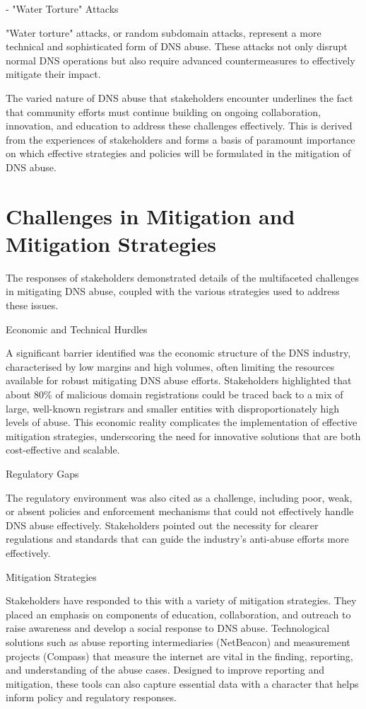 - "Water Torture" Attacks

"Water torture" attacks, or random subdomain attacks, represent a more technical and sophisticated form of DNS abuse. These attacks not only disrupt normal DNS operations but also require advanced countermeasures to effectively mitigate their impact.

The varied nature of DNS abuse that stakeholders encounter underlines the fact that community efforts must continue building on ongoing collaboration, innovation, and education to address these challenges effectively. This is derived from the experiences of stakeholders and forms a basis of paramount importance on which effective strategies and policies will be formulated in the mitigation of DNS abuse.

\section{Challenges in Mitigation and Mitigation Strategies} 

The responses of stakeholders demonstrated details of the multifaceted challenges in mitigating DNS abuse, coupled with the various strategies used to address these issues.

Economic and Technical Hurdles

A significant barrier identified was the economic structure of the DNS industry, characterised by low margins and high volumes, often limiting the resources available for robust mitigating DNS abuse efforts. Stakeholders highlighted that about 80\% of malicious domain registrations could be traced back to a mix of large, well-known registrars and smaller entities with disproportionately high levels of abuse. This economic reality complicates the implementation of effective mitigation strategies, underscoring the need for innovative solutions that are both cost-effective and scalable.

Regulatory Gaps

The regulatory environment was also cited as a challenge, including poor, weak, or absent policies and enforcement mechanisms that could not effectively handle DNS abuse effectively. Stakeholders pointed out the necessity for clearer regulations and standards that can guide the industry's anti-abuse efforts more effectively.

Mitigation Strategies

Stakeholders have responded to this with a variety of mitigation strategies. They placed an emphasis on components of education, collaboration, and outreach to raise awareness and develop a social response to DNS abuse. Technological solutions such as abuse reporting intermediaries (NetBeacon) and measurement projects (Compass) that measure the internet are vital in the finding, reporting, and understanding of the abuse cases. Designed to improve reporting and mitigation, these tools can also capture essential data with a character that helps inform policy and regulatory responses.

